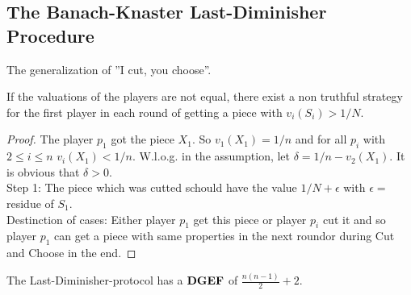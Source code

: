 \subsection{The Banach-Knaster Last-Diminisher Procedure}
The generalization of ''I cut, you choose''.
\begin{satz}
If the valuations of the players are not equal, there exist a non truthful strategy for the first player in each round of getting a piece with $v_i(S_i)>1/N$.\\
\end{satz}
\begin{proof}
The player $p_1$ got the piece $X_1$. So $v_1(X_1)=1/n$ and for all $p_i$ with $2\leq i\leq n$ $v_i(X_1)<1/n$. W.l.o.g. in the assumption, let $\delta=1/n-v_2(X_1)$. It is obvious that $\delta > 0$.\\
Step 1: The piece which was cutted schould have the value $1/N+\epsilon$  with $\epsilon =$ residue of $S_1$.\\
Destinction of cases: Either player $p_1$ get this piece or player $p_i$ cut it and so player $p_1$ can get a piece with same properties in the next roundor during Cut and Choose in the end.
\end{proof}
\begin{satz}
 The Last-Diminisher-protocol has a $\text{\textbf{DGEF}}$ of $\frac{n(n-1)}{2}+2$.
\end{satz}
\newpage
